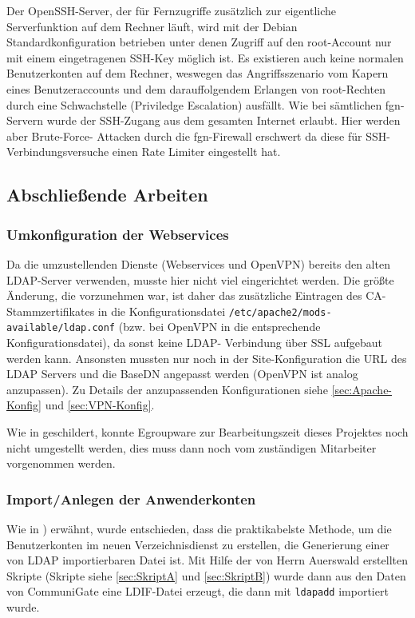 \documentclass[11pt,a4paper,titlepage=firstiscover,headsepline,bibtotoc]{scrartcl} %
\newcommand{\hilight}[1]{\colorbox{yellow}{#1}} %
\begin{document}
Der OpenSSH-Server, der für Fernzugriffe zusätzlich zur eigentliche Serverfunktion auf dem Rechner läuft, wird mit der Debian Standardkonfiguration betrieben unter denen Zugriff auf den root-Account nur mit einem eingetragenen SSH-Key möglich ist. Es existieren auch keine normalen Benutzerkonten auf dem Rechner, weswegen das Angriffsszenario vom Kapern eines Benutzeraccounts und dem darauffolgendem Erlangen von root-Rechten durch eine Schwachstelle (Priviledge Escalation) ausfällt. Wie bei sämtlichen fgn-Servern wurde der SSH-Zugang aus dem gesamten Internet erlaubt. Hier werden aber Brute-Force- Attacken durch die fgn-Firewall erschwert da diese für SSH-Verbindungsversuche einen Rate Limiter eingestellt hat.


\subsection{Abschließende Arbeiten}
\subsubsection{Umkonfiguration der Webservices}
Da die umzustellenden Dienste (Webservices und OpenVPN) bereits den alten LDAP-Server verwenden, musste hier nicht viel eingerichtet werden. Die größte Änderung, die vorzunehmen war, ist daher das zusätzliche Eintragen des CA-Stammzertifikates in die Konfigurationsdatei \texttt{/etc/apache2/mods-available/ldap.conf} (bzw. bei OpenVPN in die entsprechende Konfigurationsdatei), da sonst keine LDAP- Verbindung über SSL aufgebaut werden kann. Ansonsten mussten nur noch in der Site-Konfiguration die URL des LDAP Servers und die BaseDN angepasst werden (OpenVPN ist analog anzupassen). Zu Details der anzupassenden Konfigurationen siehe \autoref{sec:Apache-Konfig} und \autoref{sec:VPN-Konfig}.

Wie in  geschildert, konnte Egroupware zur Bearbeitungszeit dieses Projektes noch nicht umgestellt werden, dies muss dann noch vom zuständigen Mitarbeiter vorgenommen werden.

\subsubsection{Import/Anlegen der Anwenderkonten}
Wie in ) erwähnt, wurde entschieden, dass die praktikabelste Methode, um die Benutzerkonten im neuen Verzeichnisdienst zu erstellen, die Generierung einer von LDAP importierbaren Datei ist. Mit Hilfe der von Herrn Auerswald erstellten Skripte (Skripte siehe \autoref{sec:SkriptA} und \autoref{sec:SkriptB}) wurde dann aus den Daten von CommuniGate eine LDIF-Datei erzeugt, die dann mit \texttt{ldapadd} importiert wurde.
\end{document}
